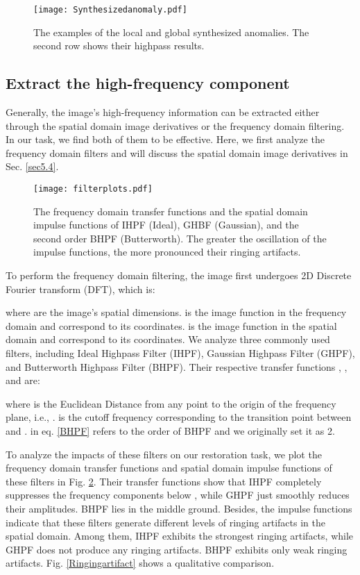 \documentclass[5p, twocolumn]{elsarticle}[draft]
\begin{document}
\begin{figure}[h]
    \centering
		\texttt{[image: Synthesizedanomaly.pdf]}
	\caption{The examples of the local and global synthesized anomalies. The second row shows their highpass results.}
	\label{Synthesizedanomaly}
\end{figure}

\subsection{Extract the high-frequency component}
\label{3.2}
Generally, the image's high-frequency information can be extracted either through the spatial domain image derivatives or the frequency domain filtering. In our task, we find both of them to be effective. Here, we first analyze the frequency domain filters and will discuss the spatial domain image derivatives in Sec. \ref{sec5.4}.

\begin{figure}[h]
    \centering
		\texttt{[image: filterplots.pdf]}
	\caption{The frequency domain transfer functions and the spatial domain impulse functions of IHPF (Ideal), GHBF (Gaussian), and the second order BHPF (Butterworth). The greater the oscillation of the impulse functions, the more pronounced their ringing artifacts.}
	\label{frequencyplot}
\end{figure}
To perform the frequency domain filtering, the image first undergoes 2D Discrete Fourier transform (DFT), which is:

where  are the image's spatial dimensions.  is the image function in the frequency domain and  correspond to its coordinates.  is the image function in the spatial domain and  correspond to its coordinates. We analyze three commonly used filters, including Ideal Highpass Filter (IHPF), Gaussian Highpass Filter (GHPF), and Butterworth Highpass Filter (BHPF). Their respective transfer functions , , and  are:





where  is the Euclidean Distance from any point  to the origin of the frequency plane, i.e., .  is the cutoff frequency corresponding to the transition point between  and .  in eq. \ref{BHPF} refers to the order of BHPF and we originally set it as 2.

To analyze the impacts of these filters on our restoration task, we plot the frequency domain transfer functions and spatial domain impulse functions of these filters in Fig. \ref{frequencyplot}. Their transfer functions show that IHPF completely suppresses the frequency components below , while GHPF just smoothly reduces their amplitudes. BHPF lies in the middle ground. Besides, the impulse functions indicate that these filters generate different levels of ringing artifacts in the spatial domain. Among them, IHPF exhibits the strongest ringing artifacts, while GHPF does not produce any ringing artifacts. BHPF exhibits only weak ringing artifacts. Fig. \ref{Ringingartifact} shows a qualitative comparison. 
\end{document}
